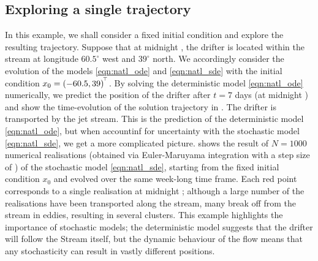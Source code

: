 


\subsection{Exploring a single trajectory}
In this example, we shall consider a fixed initial condition and explore the resulting trajectory.
Suppose that at midnight , the drifter is located within the stream  at longitude \(60.5^\circ\) west and \(39^\circ\) north.
We accordingly consider the evolution of the models \cref{eqn:natl_ode} and \cref{eqn:natl_sde} with the initial condition \(x_0 = (-60.5, 39)^{^{\!\top}}\).
By solving the deterministic model \cref{eqn:natl_ode} numerically, we predict the position of the drifter after \(t = 7\) days (at midnight ) and show the time-evolution of the solution trajectory in .
The drifter is transported by the jet stream.
This is the prediction of the deterministic model \cref{eqn:natl_ode}, but when accountinf for uncertainty with the stochastic model \cref{eqn:natl_sde}, we get a more complicated picture.
 shows the result of \(N = 1000\) numerical realisations (obtained via Euler-Maruyama integration with a step size of ) of the stochastic model \cref{eqn:natl_sde}, starting from the fixed initial condition \(x_0\) and evolved over the same week-long time frame.
Each red point corresponds to a single realisation at midnight ; although a large number of the realisations have been transported along the stream, many break off from the stream in eddies, resulting in several clusters.
This example highlights the importance of stochastic models; the deterministic model suggests that the drifter will follow the Stream itself, but the dynamic behaviour of the flow means that any stochasticity can result in vastly different positions.

